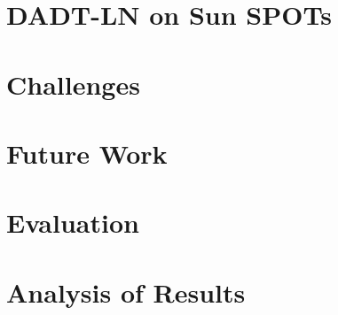 \section{DADT-LN on Sun SPOTs}

\section{Challenges}

\section{Future Work}

\section{Evaluation}

\section{Analysis of Results}

